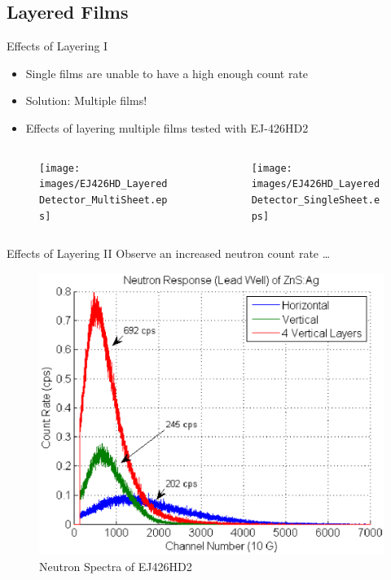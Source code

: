 \subsection*{Layered Films}
\begin{frame}{Effects of Layering I}
\small
\begin{itemize}
	\item Single films are unable to have a high enough count rate
	\item Solution: Multiple films!
	\item Effects of layering multiple films tested with EJ-426HD2
\end{itemize}
\begin{columns}[onlytextwidth]
\begin{column}{0.45\textwidth}
	\tiny
	\begin{figure}
		\centering
		\texttt{[image: images/EJ426HD\_LayeredDetector\_MultiSheet.eps]}
	\end{figure}
\end{column}
\begin{column}{0.45\textwidth}
	\tiny
	\begin{figure}
		\centering
		\texttt{[image: images/EJ426HD\_LayeredDetector\_SingleSheet.eps]}
	\end{figure}
\end{column}
\end{columns}
\end{frame}
\begin{frame}{Effects of Layering II}
Observe an increased neutron count rate \dots
	\begin{figure}
		\centering
		\includegraphics[height=0.6\textheight]{images/EJ426HD_Multi_NeutronComparison.eps}
		\small \caption{Neutron Spectra of EJ426HD2}
	\end{figure}
\end{frame}
